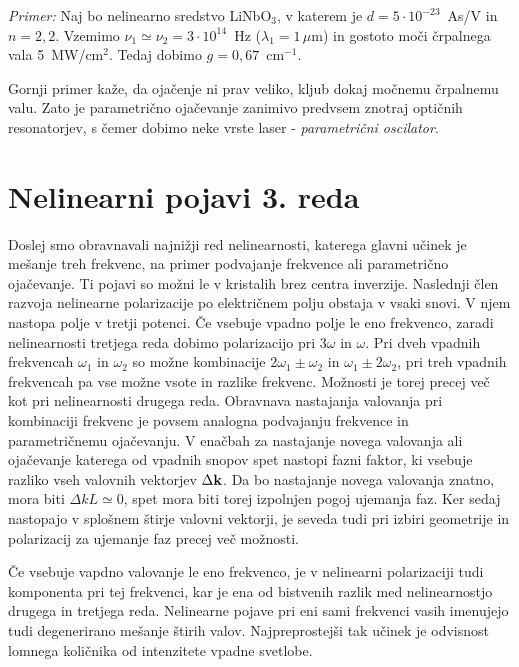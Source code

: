 \textit{Primer:} Naj bo nelinearno sredstvo LiNbO$_{3}$, v katerem
je $d=5\cdot10^{-23}$~As/V in $n=2,2$. Vzemimo $\nu_{1}\simeq\nu_{2}=3\cdot10^{14}$~Hz
($\lambda_{1}=1\,\mu$m) in gostoto moči črpalnega vala 5~MW/cm$^{2}$.
Tedaj dobimo $g=0,67$~cm$^{-1}$.

Gornji primer kaže, da ojačenje ni prav veliko, kljub dokaj močnemu
črpalnemu valu. Zato je parametrično ojačevanje zanimivo predvsem
znotraj optičnih resonatorjev, s čemer dobimo neke vrste laser - \textit{parametrični
oscilator}.


\section{Nelinearni pojavi 3. reda}

Doslej smo obravnavali najnižji red nelinearnosti, katerega glavni
učinek je mešanje treh frekvenc, na primer podvajanje frekvence ali
parametrično ojačevanje. Ti pojavi so možni le v kristalih brez centra
inverzije. Naslednji člen razvoja nelinearne polarizacije po električnem
polju obstaja v vsaki snovi. V njem nastopa polje v tretji potenci.
Če vsebuje vpadno polje le eno frekvenco, zaradi nelinearnosti tretjega
reda dobimo polarizacijo pri 3$\omega$ in $\omega$. Pri dveh vpadnih
frekvencah $\omega_{1}$ in $\omega_{2}$ so možne kombinacije $2\omega_{1}\pm\omega_{2}$
in $\omega_{1}\pm2\omega_{2}$, pri treh vpadnih frekvencah pa vse
možne vsote in razlike frekvenc. Možnosti je torej precej več kot
pri nelinearnosti drugega reda. Obravnava nastajanja valovanja pri
kombinaciji frekvenc je povsem analogna podvajanju frekvence in parametričnemu
ojačevanju. V enačbah za nastajanje novega valovanja ali ojačevanje
katerega od vpadnih snopov spet nastopi fazni faktor, ki vsebuje razliko
vseh valovnih vektorjev $\Delta{\bf k}$. Da bo nastajanje novega
valovanja znatno, mora biti $\Delta kL\simeq0$, spet mora biti torej
izpolnjen pogoj ujemanja faz. Ker sedaj nastopajo v splošnem štirje
valovni vektorji, je seveda tudi pri izbiri geometrije in polarizacij
za ujemanje faz precej več možnosti.

Če vsebuje vapdno valovanje le eno frekvenco, je v nelinearni polarizaciji
tudi komponenta pri tej frekvenci, kar je ena od bistvenih razlik
med nelinearnostjo drugega in tretjega reda. Nelinearne pojave pri
eni sami frekvenci v\textquotedbl{}asih imenujejo tudi degenerirano
mešanje štirih valov. Najpreprostejši tak učinek je odvisnost lomnega
količnika od intenzitete vpadne svetlobe.

